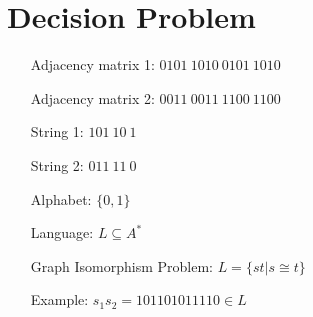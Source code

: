 \documentclass[a4paper]{tufte-handout}
\begin{document}
\section{Decision Problem}
    \begin{itemize}
        \item[Adjacency matrix 1:] $0101\ 1010\ 0101\ 1010$
        \item[Adjacency matrix 2:] $0011\ 0011\ 1100\ 1100$
        \item[String 1:] $101\ 10\ 1$
        \item[String 2:] $011\ 11\ 0$
        \item[Alphabet:] $\{0,1\}$
        \item[Language:] $L \subseteq A^*$
        \item[Graph Isomorphism Problem:] $L = \{ st | s \cong t \}$
        \item[Example:] $s_1 s_2 = 101 10 1 011 11 0 \in L $
    \end{itemize}
\end{document}
